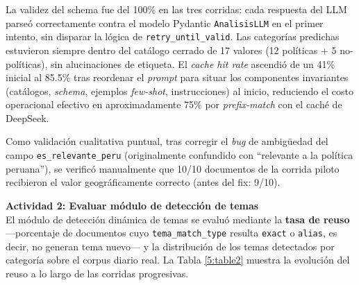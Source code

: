 La validez del schema fue del 100\% en las tres corridas: cada respuesta del
LLM parseó correctamente contra el modelo Pydantic \texttt{AnalisisLLM} en el
primer intento, sin disparar la lógica de \texttt{retry\_until\_valid}. Las
categorías predichas estuvieron siempre dentro del catálogo cerrado de 17
valores (12 políticas + 5 no-políticas), sin alucinaciones de etiqueta. El
\textit{cache hit rate} ascendió de un 41\% inicial al 85.5\% tras reordenar
el \textit{prompt} para situar los componentes invariantes (catálogos,
\textit{schema}, ejemplos \textit{few-shot}, instrucciones) al inicio,
reduciendo el costo operacional efectivo en aproximadamente 75\% por
\textit{prefix-match} con el caché de DeepSeek.

Como validación cualitativa puntual, tras corregir el \textit{bug} de
ambigüedad del campo \texttt{es\_relevante\_peru} (originalmente confundido
con ``relevante a la política peruana''), se verificó manualmente que 10/10
documentos de la corrida piloto recibieron el valor geográficamente correcto
(antes del fix: 9/10).

\textbf{Actividad 2: Evaluar módulo de detección de temas}
\\
El módulo de detección dinámica de temas se evaluó mediante la \textbf{tasa
de reuso} —porcentaje de documentos cuyo \texttt{tema\_match\_type} resulta
\texttt{exact} o \texttt{alias}, es decir, no generan tema nuevo— y la
distribución de los temas detectados por categoría sobre el corpus diario
real. La Tabla \ref{5:table2} muestra la evolución del reuso a lo largo de
las corridas progresivas.

